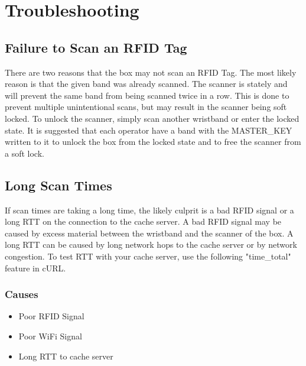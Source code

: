 \documentclass{article}
\begin{document}
\section{Troubleshooting}

\subsection{Failure to Scan an RFID Tag}
There are two reasons that the box may not scan an RFID Tag.  The most likely reason is that the given band was already scanned.  The scanner is stately and will prevent the same band from being scanned twice in a row.  This is done to prevent multiple unintentional scans, but may result in the scanner being soft locked.  To unlock the scanner, simply scan another wristband or enter the locked state.  It is suggested that each operator have a band with the MASTER\_KEY written to it to unlock the box from the locked state and to free the scanner from a soft lock.  

\subsection{Long Scan Times}
If scan times are taking a long time, the likely culprit is a bad RFID signal or a long RTT on the connection to the cache server.  A bad RFID signal may be caused by excess material between the wristband and the scanner of the box.  A long RTT can be caused by long network hops to the cache server or by network congestion.  To test RTT with your cache server, use the following "time\_total" feature in cURL. 
\subsubsection{Causes}
\begin{itemize}
	\item Poor RFID Signal
	\item Poor WiFi Signal
	\item Long RTT to cache server
\end{itemize}
\end{document}
